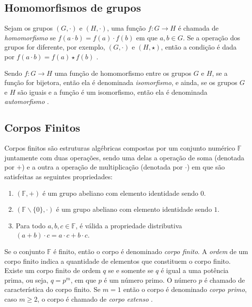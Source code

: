 %
%
\subsection{Homomorfismos de grupos}
Sejam os grupos $(G, \cdot)$ e $(H, \cdot)$, uma função $f: G \rightarrow H$ é chamada de \textit{homomorfismo} se $f(a \cdot b) = f(a) \cdot f(b)$ em que $a, b \in G$. Se a operação dos grupos for diferente, por exemplo, $(G, \cdot)$ e $(H, \star)$, então a condição é dada por $f(a \cdot b) = f(a) \star f(b)$ \cite{Gilbert:2004}.

Sendo $f: G \rightarrow H$ uma função de homomorfismo entre os grupos \(G\) e \(H\), se a função for bijetora, então ela é denominada \textit{isomorfismo}, e ainda, se os grupos \(G\) e \(H\) são iguais e a função é um isomorfismo, então ela é denominada \textit{automorfismo} \cite{Shokranian:2010}.

%
%
\subsection{Corpos Finitos}
Corpos finitos são estruturas algébricas compostas por um conjunto numérico \(\mathbb{F}\) juntamente com duas operações, sendo uma delas a operação de soma (denotada por $+$) e a outra a operação de multiplicação (denotada por $\cdot$) em que são satisfeitas as seguintes propriedades: \cite{Guide}

\begin{enumerate}
\item $(\mathbb{F}, +)$ é um grupo abeliano com elemento identidade sendo \(0\).
\item $(\mathbb{F} \backslash \{0\}, \cdot)$ é um grupo abeliano com elemento identidade sendo $1$.
\item Para todo $a, b, c \in \mathbb{F}$, é válida a propriedade distributiva $(a + b) \cdot c = a \cdot c + b \cdot c$.
\end{enumerate}

Se o conjunto \(\mathbb{F}\) é finito, então o corpo é denominado \textit{corpo finito}. A \textit{ordem} de um corpo finito indica a quantidade de elementos que constituem o corpo finito. Existe um corpo finito de ordem \(q\) se e somente se \(q\) é igual a uma potência prima, ou seja, $q = p^{m}$, em que \(p\) é um número primo. O número \(p\) é chamado de característica do corpo finito. Se $m = 1$ então o corpo é denominado \textit{corpo primo}, caso $m \geq 2$, o corpo é chamado de \textit{corpo extenso} \cite{Guide}.


